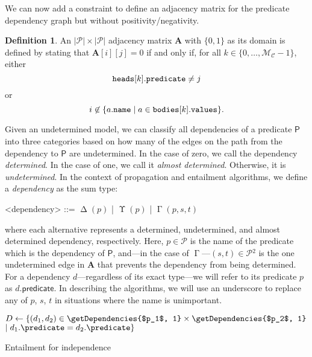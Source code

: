 \documentclass[letterpaper]{article}
\makeatletter
\theoremstyle{definition}
\newtheorem{definition}{Definition}
\newcommand{\nosemic}{\renewcommand{\@endalgocfline}{\relax}}%
\newcommand{\dosemic}{\renewcommand{\@endalgocfline}{\algocf@endline}}%
\newcommand{\variable}[1]{\texttt{\textup{#1}}}
\newcommand{\predicates}{\mathcal{P}}
\newcommand{\maxNumClauses}{\mathcal{M}_{\mathcal{C}}}
\DeclareMathOperator{\Determined}{\Delta}
\DeclareMathOperator{\Undetermined}{\Upsilon}
\DeclareMathOperator{\AlmostDetermined}{\Gamma}
\makeatother
\begin{document}
We can now add a constraint to define an adjacency matrix for the predicate
dependency graph but without positivity/negativity.

\begin{definition} \label{def:adjacency_matrix}
  An $|\predicates{}| \times |\predicates{}|$ adjacency matrix $\mathbf{A}$ with
  $\{ 0, 1 \}$ as its domain is defined by stating that $\mathbf{A}[i][j] = 0$
  if and only if, for all $k \in \{ 0, \dots, \maxNumClauses{} - 1 \}$, either
  \[
    \variable{heads}[k].\variable{predicate} \ne j
  \]
  or
  \[
    i \not\in \{a.\variable{name} \mid a \in
    \variable{bodies}[k].\variable{values} \}.
  \]
\end{definition}

Given an undetermined model, we can classify all dependencies of a predicate
$\mathsf{P}$ into three categories based on how many of the edges on the path
from the dependency to $\mathsf{P}$ are undetermined. In the case of zero, we
call the dependency \emph{determined}. In the case of one, we call it
\emph{almost determined}. Otherwise, it is \emph{undetermined}. In the context
of propagation and entailment algorithms, we define a \emph{dependency} as the
sum type:
\begin{grammar}
  <dependency> ::= $\Determined(p)$ | $\Undetermined(p)$ | $\AlmostDetermined(p,
  s, t)$
\end{grammar}
where each alternative represents a determined, undetermined, and almost
determined dependency, respectively. Here, $p \in \predicates{}$ is the name of
the predicate which is the dependency of $\mathsf{P}$, and---in the case of
$\AlmostDetermined$---$(s, t) \in \predicates{}^2$ is the one undetermined edge
in $\mathbf{A}$ that prevents the dependency from being determined. For a
dependency $d$---regardless of its exact type---we will refer to its predicate
$p$ as $d.\mathsf{predicate}$. In describing the algorithms, we will use an
underscore to replace any of $p$, $s$, $t$ in situations where the name is
unimportant.

\begin{algorithm}
  \nosemic $D \gets \{ (d_1, d_2) \in \getDependencies{$p_1$, 1} \times \getDependencies{$p_2$, 1}$\;
  \hspace{27pt}\dosemic $\mid d_1.\predicate = d_2.\predicate \}$\;
  \lIf{$\exists (\Determined \_, \Determined \_) \in D$}{\Return{\textsc{false}}}
  \;
  \caption{Entailment for independence}
  \label{alg:independence_entailment}
\end{algorithm}
\end{document}
